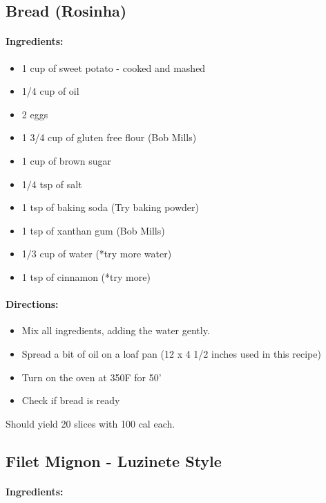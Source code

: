 \documentclass{article}
\begin{document}
\subsection{Bread (Rosinha)}

\paragraph{Ingredients:}

\begin{itemize}
	\item 1 cup of sweet potato - cooked and mashed
	\item 1/4 cup of oil
	\item 2 eggs
	\item 1 3/4 cup of gluten free flour (Bob Mills)
	\item 1 cup of brown sugar 
	\item 1/4 tsp of salt
	\item 1 tsp of baking soda (Try baking powder)
	\item 1 tsp of xanthan gum (Bob Mills)
	\item 1/3 cup of water (*try more water)
	\item 1 tsp of cinnamon (*try more)
\end{itemize}

\paragraph{Directions:}
\begin{itemize}
	\item Mix all ingredients, adding the water gently.
	\item Spread a bit of oil on a loaf pan (12 x 4 1/2 inches used in this recipe)
	\item Turn on the oven at 350F for 50'
	\item Check if bread is ready
\end{itemize}

Should yield 20 slices with 100 cal each.

\subsection{Filet Mignon - Luzinete Style}

\paragraph{Ingredients:}
\end{document}
